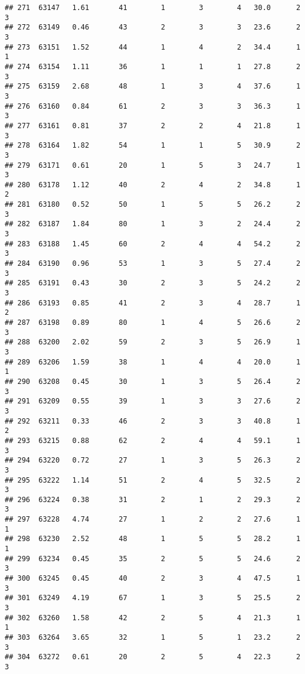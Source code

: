 \documentclass[
]{article}
\begin{document}
\begin{verbatim}
## 271  63147   1.61       41        1        3        4   30.0      2      3
## 272  63149   0.46       43        2        3        3   23.6      2      3
## 273  63151   1.52       44        1        4        2   34.4      1      1
## 274  63154   1.11       36        1        1        1   27.8      2      3
## 275  63159   2.68       48        1        3        4   37.6      1      3
## 276  63160   0.84       61        2        3        3   36.3      1      3
## 277  63161   0.81       37        2        2        4   21.8      1      3
## 278  63164   1.82       54        1        1        5   30.9      2      3
## 279  63171   0.61       20        1        5        3   24.7      1      3
## 280  63178   1.12       40        2        4        2   34.8      1      2
## 281  63180   0.52       50        1        5        5   26.2      2      3
## 282  63187   1.84       80        1        3        2   24.4      2      3
## 283  63188   1.45       60        2        4        4   54.2      2      3
## 284  63190   0.96       53        1        3        5   27.4      2      3
## 285  63191   0.43       30        2        3        5   24.2      2      3
## 286  63193   0.85       41        2        3        4   28.7      1      2
## 287  63198   0.89       80        1        4        5   26.6      2      3
## 288  63200   2.02       59        2        3        5   26.9      1      3
## 289  63206   1.59       38        1        4        4   20.0      1      1
## 290  63208   0.45       30        1        3        5   26.4      2      3
## 291  63209   0.55       39        1        3        3   27.6      2      3
## 292  63211   0.33       46        2        3        3   40.8      1      2
## 293  63215   0.88       62        2        4        4   59.1      1      3
## 294  63220   0.72       27        1        3        5   26.3      2      3
## 295  63222   1.14       51        2        4        5   32.5      2      3
## 296  63224   0.38       31        2        1        2   29.3      2      3
## 297  63228   4.74       27        1        2        2   27.6      1      1
## 298  63230   2.52       48        1        5        5   28.2      1      1
## 299  63234   0.45       35        2        5        5   24.6      2      3
## 300  63245   0.45       40        2        3        4   47.5      1      3
## 301  63249   4.19       67        1        3        5   25.5      2      3
## 302  63260   1.58       42        2        5        4   21.3      1      1
## 303  63264   3.65       32        1        5        1   23.2      2      3
## 304  63272   0.61       20        2        5        4   22.3      2      3

\end{verbatim}
\end{document}
